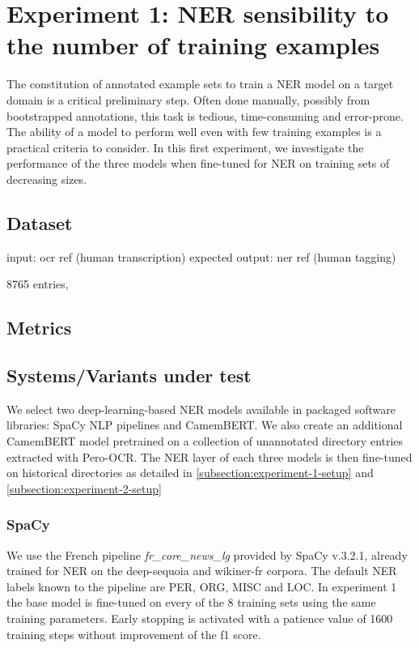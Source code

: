 \section{Experiment 1: NER sensibility to the number of training examples}
\label{sec:ner-xp1}

The constitution of annotated example sets to train a NER model on a target domain is a critical preliminary step.
Often done manually, possibly from bootstrapped annotations, this task is tedious, time-consuming and error-prone.
The ability of a model to perform well even with few training examples is a practical criteria to consider.
In this first experiment, we investigate the performance of the three models when fine-tuned for NER on training sets of decreasing sizes.

\subsection{Dataset}
input: ocr ref (human transcription)
expected output: ner ref (human tagging)

8765 entries, 

\subsection{Metrics}



\subsection{Systems/Variants under test}
We select two deep-learning-based NER models available in packaged software libraries: SpaCy NLP pipelines and CamemBERT.
We also create an additional CamemBERT model pretrained on a collection of unannotated directory entries extracted with Pero-OCR.
The NER layer of each three models is then fine-tuned on historical directories as detailed in \cref{subsection:experiment-1-setup} and \cref{subsection:experiment-2-setup}

\subsubsection{SpaCy}
We use the French pipeline \textit{fr\_core\_news\_lg} provided by SpaCy v.3.2.1, already trained for NER on the deep-sequoia and wikiner-fr corpora.
The default NER labels known to the pipeline are PER, ORG, MISC and LOC.
In experiment 1 the base model is fine-tuned on every of the 8 training sets using the same training parameters.
Early stopping is activated with a patience value of 1600 training steps without improvement of the f1 score.

